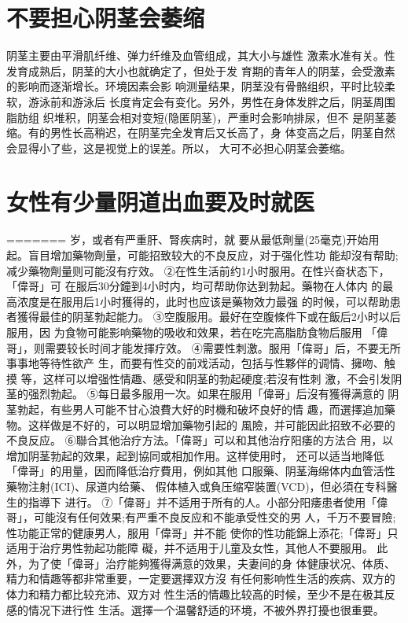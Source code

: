 \documentclass[12pt,UTF8]{ctexbook}
\begin{document}
\section{不要担心阴茎会萎缩}
阴茎主要由平滑肌纤维、弹力纤维及血管组成，其大小与雄性
激素水准有关。性发育成熟后，阴茎的大小也就确定了，但处于发
育期的青年人的阴茎，会受激素的影响而逐渐增长。环境因素会影
响测量结果，阴茎没有骨骼组织，平时比较柔软，游泳前和游泳后
长度肯定会有变化。另外，男性在身体发胖之后，阴茎周围脂肪组
织堆积，阴茎会相对变短(隐匿阴茎)，严重时会影响排尿，但不
是阴茎萎缩。有的男性长高稍迟，在阴茎完全发育后又长高了，身
体变高之后，阴茎自然会显得小了些，这是视觉上的误差。所以，
大可不必担心阴茎会萎缩。

\section{女性有少量阴道出血要及时就医}
=======
岁，或者有严重肝、腎疾病时，就
要从最低劑量(25毫克)开始用
起。盲目增加藥物劑量，可能招致较大的不良反应，对于强化性功
能却沒有帮助;减少藥物劑量则可能沒有疗效。
②在性生活前约1小时服用。在性兴奋状态下，「偉哥」可
在服后30分鐘到4小时内，均可帮助你达到勃起。藥物在人体内
的最高浓度是在服用后1小时獲得的，此时也应该是藥物效力最强
的时候，可以帮助患者獲得最佳的阴茎勃起能力。
③空腹服用。最好在空腹條件下或在飯后2小时以后服用，因
为食物可能影响藥物的吸收和效果，若在吃完高脂肪食物后服用
「偉哥」，则需要较长时间才能发揮疗效。
④需要性刺激。服用「偉哥」后，不要无所事事地等待性欲产
生，而要有性交的前戏活动，包括与性夥伴的调情、擁吻、触摸
等，这样可以增强性情趣、感受和阴茎的勃起硬度;若沒有性刺
激，不会引发阴茎的强烈勃起。
⑤每日最多服用一次。如果在服用「偉哥」后沒有獲得满意的
阴茎勃起，有些男人可能不甘心浪費大好的时機和破坏良好的情
趣，而選擇追加藥物。这样做是不好的，可以明显增加藥物引起的
風險，并可能因此招致不必要的不良反应。
⑥聯合其他治疗方法。「偉哥」可以和其他治疗阳痿的方法合
用，以增加阴茎勃起的效果，起到協同或相加作用。这样使用时，
还可以适当地降低「偉哥」的用量，因而降低治疗費用，例如其他
口服藥、阴茎海绵体内血管活性藥物注射(ICI)、尿道内给藥、
假体植入或負压缩窄裝置(VCD)，但必須在专科醫生的指導下
进行。
⑦「偉哥」并不适用于所有的人。小部分阳痿患者使用「偉
哥」，可能沒有任何效果;有严重不良反应和不能承受性交的男
人，千万不要冒險;性功能正常的健康男人，服用「偉哥」并不能
使你的性功能錦上添花;「偉哥」只适用于治疗男性勃起功能障
礙，并不适用于儿童及女性，其他人不要服用。
此外，为了使「偉哥」治疗能夠獲得满意的效果，夫妻间的身
体健康状况、体质、精力和情趣等都非常重要，一定要選擇双方沒
有任何影响性生活的疾病、双方的体力和精力都比较充沛、双方对
性生活的情趣比较高的时候，至少不是在极其反感的情况下进行性
生活。選擇一个温馨舒适的环境，不被外界打擾也很重要。
\end{document}
